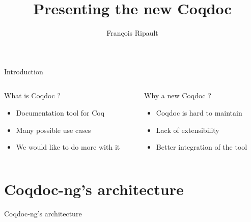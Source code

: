 \documentclass[compress]{beamer}
\title{Presenting the new Coqdoc}
\author{François Ripault}
\begin{document}
\begin{frame}
\titlepage
\end{frame}

\begin{frame}{Introduction}
  \begin{columns}[2]

    \begin{column}{0.5\textwidth}
      What is Coqdoc ?
      \begin{itemize}
        \item Documentation tool for Coq
        \item Many possible use cases
        \item We would like to do more with it
      \end{itemize}
    \end{column}

    \begin{column}{0.5\textwidth}
      Why a new Coqdoc ?
      \begin{itemize}[<+->]
        \item Coqdoc is hard to maintain
        \item Lack of extensibility
        \item Better integration of the tool
      \end{itemize}
    \end{column}

  \end{columns}
\end{frame}

\begin{frame}
  \begin{multicols}{2}
    \small
    \tableofcontents
  \end{multicols}
\end{frame}

\section{Coqdoc-ng's architecture}
  \begin{frame}{Coqdoc-ng's architecture}
    
  \end{frame}
\end{document}
